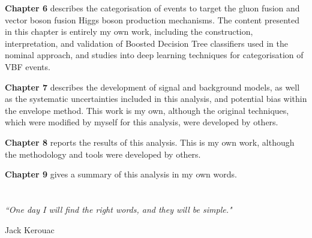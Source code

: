 \textbf{Chapter 6} describes the categorisation of \Hee events to target the gluon fusion and vector boson fusion Higgs boson production mechanisms. The content presented in this chapter is entirely my own work, including the construction, interpretation, and validation of Boosted Decision Tree classifiers used in the nominal approach, and studies into deep learning techniques for categorisation of VBF events.

\textbf{Chapter 7} describes the development of signal and background models, as well as the systematic uncertainties included in this analysis, and potential bias within the envelope method. This work is my own, although the original techniques, which were modified by myself for this analysis, were developed by others. 

\textbf{Chapter 8} reports the results of this analysis. This is my own work, although the methodology and tools were developed by others.

\textbf{Chapter 9} gives a summary of this analysis in my own words.

\chapter*{}
\epigraph{
  \textit{``One day I will find the right words, and they will be simple."}}
          {Jack Kerouac}
\cleardoublepage


